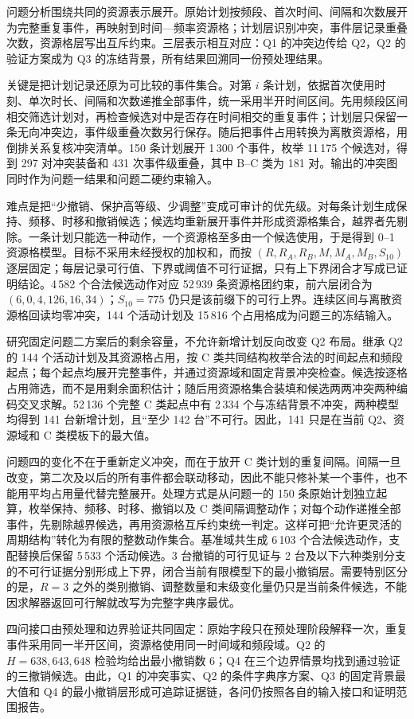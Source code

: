 问题分析围绕共同的资源表示展开。原始计划按频段、首次时间、间隔和次数展开为完整重复事件，再映射到时间—频率资源格；计划层识别冲突，事件层记录重叠次数，资源格层写出互斥约束。三层表示相互对应：Q1 的冲突边传给 Q2，Q2 的验证方案成为 Q3 的冻结背景，所有结果回溯同一份预处理结果。

关键是把计划记录还原为可比较的事件集合。对第 $i$ 条计划，依据首次使用时刻、单次时长、间隔和次数递推全部事件，统一采用半开时间区间。先用频段区间相交筛选计划对，再检查候选对中是否存在时间相交的重复事件；计划层只保留一条无向冲突边，事件级重叠次数另行保存。随后把事件占用转换为离散资源格，用倒排关系复核冲突清单。150 条计划展开 1\,300 个事件，枚举 11\,175 个候选对，得到 297 对冲突装备和 431 次事件级重叠，其中 B--C 类为 181 对。输出的冲突图同时作为问题一结果和问题二硬约束输入。

难点是把“少撤销、保护高等级、少调整”变成可审计的优先级。对每条计划生成保持、频移、时移和撤销候选；候选均重新展开事件并形成资源格集合，越界者先剔除。一条计划只能选一种动作，一个资源格至多由一个候选使用，于是得到 0--1 资源格模型。目标不采用未经授权的加权和，而按 $(R,R_A,R_B,M,M_A,M_B,S_{10})$ 逐层固定；每层记录可行值、下界或阈值不可行证据，只有上下界闭合才写成已证明结论。4\,582 个合法候选动作对应 52\,939 条资源格团约束，前六层闭合为 $(6,0,4,126,16,34)$；$S_{10}=775$ 仍只是该前缀下的可行上界。连续区间与离散资源格回读均零冲突，144 个活动计划及 15\,816 个占用格成为问题三的冻结输入。

研究固定问题二方案后的剩余容量，不允许新增计划反向改变 Q2 布局。继承 Q2 的 144 个活动计划及其资源格占用，按 C 类共同结构枚举合法的时间起点和频段起点；每个起点均展开完整事件，并通过资源域和固定背景冲突检查。候选按逐格占用筛选，而不是用剩余面积估计；随后用资源格集合装填和候选两两冲突两种编码交叉求解。52\,136 个完整 C 类起点中有 2\,334 个与冻结背景不冲突，两种模型均得到 141 台新增计划，且“至少 142 台”不可行。因此，141 只是在当前 Q2、资源域和 C 类模板下的最大值。

问题四的变化不在于重新定义冲突，而在于放开 C 类计划的重复间隔。间隔一旦改变，第二次及以后的所有事件都会联动移动，因此不能只修补某一个事件，也不能用平均占用量代替完整展开。处理方式是从问题一的 150 条原始计划独立起算，枚举保持、频移、时移、撤销以及 C 类间隔调整动作；对每个动作递推全部事件，先剔除越界候选，再用资源格互斥约束统一判定。这样可把“允许更灵活的周期结构”转化为有限的整数动作集合。基准域共生成 6\,103 个合法候选动作，支配替换后保留 5\,533 个活动候选。3 台撤销的可行见证与 2 台及以下六种类别分支的不可行证据分别形成上下界，闭合当前有限模型下的最小撤销层。需要特别区分的是，$R=3$ 之外的类别撤销、调整数量和末级变化量仍只是当前条件候选，不能因求解器返回可行解就改写为完整字典序最优。

四问接口由预处理和边界验证共同固定：原始字段只在预处理阶段解释一次，重复事件采用同一半开区间，资源格使用同一时间域和频段域。Q2 的 $H=638,643,648$ 检验均给出最小撤销数 6；Q4 在三个边界情景均找到通过验证的三撤销候选。由此，Q1 的冲突事实、Q2 的条件字典序方案、Q3 的固定背景最大值和 Q4 的最小撤销层形成可追踪证据链，各问仍按照各自的输入接口和证明范围报告。
